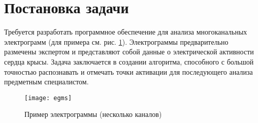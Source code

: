 \section{Постановка задачи}

Требуется разработать программное обеспечение для анализа многоканальных
электрограмм (для примера см. рис. \ref{fig:egms}). Электрограммы
предварительно размечены экспертом и представляют собой данные о электрической
активности сердца крысы. Задача заключается в создании алгоритма, способного с
большой точностью распознавать и отмечать точки активации для последующего
анализа предметным специалистом.

\begin{figure}[!htb]
	\centering
	\caption{Пример электрограммы (несколько каналов)}
	\label{fig:egms}
	\texttt{[image: egms]}
\end{figure}
